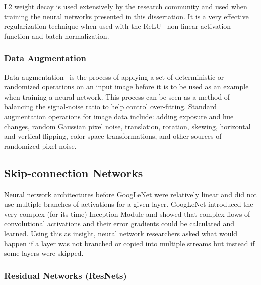 \noindent L2 weight decay is used extensively by the research community and used when training the neural networks presented in this dissertation.  It is a very effective regularization technique when used with the ReLU~\cite{mishkin_all_2015,nair_rectified_2010,dahl_improving_2013} non-linear activation function and batch normalization.

\subsubsection{Data Augmentation}

Data augmentation~\cite{taylor_improving_2017,eggert_benefit_2015} is the process of applying a set of deterministic or randomized operations on an input image before it is to be used as an example when training a neural network.  This process can be seen as a method of balancing the signal-noise ratio to help control over-fitting.  Standard augmentation operations for image data include: adding exposure and hue changes, random Gaussian pixel noise, translation, rotation, skewing, horizontal and vertical flipping, color space transformations, and other sources of randomized pixel noise.

\subsection{Skip-connection Networks}

Neural network architectures before GoogLeNet were relatively linear and did not use multiple branches of activations for a given layer.  GoogLeNet introduced the very complex (for its time) Inception Module and showed that complex flows of convolutional activations and their error gradients could be calculated and learned.  Using this as insight, neural network researchers asked what would happen if a layer was not branched or copied into multiple streams but instead if some layers were skipped.

\subsubsection{Residual Networks (ResNets)}

